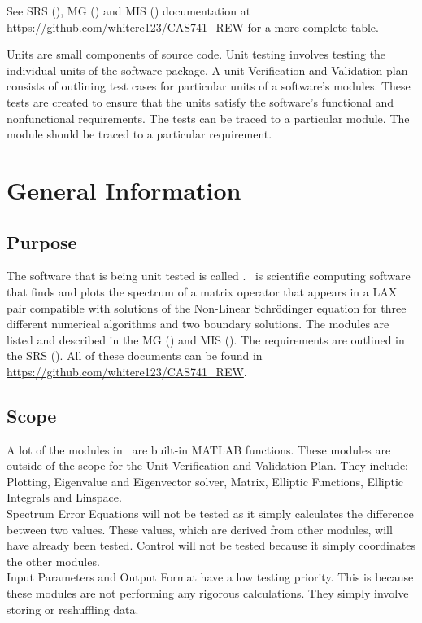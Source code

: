 \documentclass[12pt, titlepage]{article}
\begin{document}
See SRS (\cite{SRS}), MG (\cite{MG}) and MIS (\cite{MIS}) documentation at 
\url{https://github.com/whitere123/CAS741_REW} for a more complete table. 

\newpage


Units are small components of source code. Unit testing involves testing 
the individual units of the software package.  A unit Verification and 
Validation plan consists of outlining test cases for particular units of a 
software's modules. These tests are created to ensure that the units satisfy 
the software's functional and nonfunctional requirements. The tests can be 
traced to a particular module. The module should be traced to a particular 
requirement. 

\section{General Information}

\subsection{Purpose}

The software that is being unit tested is called \progname. \progname \ is 
scientific computing software that finds and plots the spectrum of a matrix 
operator that appears in a LAX pair compatible with solutions of the Non-Linear 
Schr\"{o}dinger equation for three different numerical algorithms and two 
boundary solutions. The modules are listed and described in the MG (\cite{MG}) 
and 
MIS (\cite{MIS}). The requirements are outlined in the SRS (\cite{SRS}). All of 
these documents can be 
found in \url{https://github.com/whitere123/CAS741_REW}. 

\subsection{Scope}

A lot of the modules in \progname \ are built-in MATLAB functions. These 
modules 
are outside of the scope for the Unit Verification and Validation Plan. They 
include: Plotting, Eigenvalue and Eigenvector solver, Matrix, Elliptic 
Functions, Elliptic Integrals and Linspace.\\ 
Spectrum Error Equations will not 
be tested as it simply calculates the difference between two values. These 
values, which are derived from other modules, will have already been tested. 
Control will not be tested because it simply coordinates the other modules.\\
Input Parameters and Output Format have a low testing priority. This is because 
these modules are not performing any rigorous calculations. They simply involve 
storing or reshuffling data. 
\end{document}
